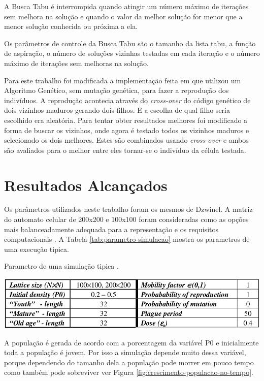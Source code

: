 \documentclass[12pt]{article}
\begin{document}
A Busca Tabu é interrompida quando atingir um número máximo de iterações sem
melhora na solução e quando o valor da melhor solução for menor que a menor
solução conhecida ou próxima a ela.

Os parâmetros de controle da Busca Tabu são o tamanho da lista tabu, a função
de aspiração, o número de soluções vizinhas testadas em cada iteração e o
número máximo de iterações sem melhoras na solução.

Para este trabalho foi modificada a implementação feita em \cite{dzwinel:04}
que utilizou um Algoritmo Genético, sem mutação genética, para fazer a 
reprodução dos indivíduos. A reprodução acontecia através do
\textit{cross-over} do código genético de dois vizinhos maduros gerando dois
filhos. E a escolha de qual filho seria escolhido era aleatória. Para
tentar obter resultados melhores foi modificado a forma de buscar os vizinhos,
onde agora é testado todos os vizinhos maduros e selecionado os dois melhores.
Estes são combinados usando \textit{cross-over} e ambos são avaliados para
o melhor entre eles tornar-se o indivíduo da célula testada. 


\section{Resultados Alcançados}

Os parâmetros utilizados neste trabalho foram os mesmos de Dzwinel.
A matriz do automato celular de 200x200	e 100x100 foram consideradas como
as opções mais balanceadamente adequada para a representação e os requisitos
computacionais \cite{dzwinel:04}. A Tabela \ref{tab:parametro-simulacao}
mostra os parametros de uma execução tipica.

\begin{table}[ht]
\centering
\caption{Parametro de uma simulação tipica \cite{dzwinel:04}.}
\label{tab:parametro-simulacao}
\includegraphics[width=.7\textwidth]{imagens/parametro-simulacao}
\end{table}

A população é gerada de acordo com a porcentagem da variável P0 e inicialmente
toda a população é jovem. Por isso a simulação depende muito dessa variável,
porque dependendo do tamanho dela a população pode morrer em pouco tempo como
também pode sobreviver ver Figura \ref{fig:crescimento-populacao-no-tempo}.
\end{document}
